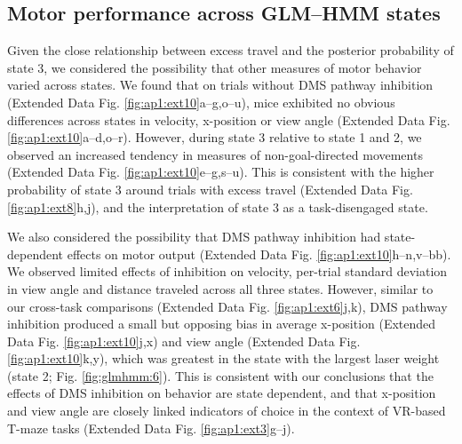\subsection{Motor performance across GLM–HMM states}
\label{sec:glmhmm:2.2.10}

Given the close relationship between excess travel and the posterior probability of state 3, we considered the possibility that other measures of motor behavior varied across states. We found that on trials without DMS pathway inhibition (Extended Data Fig. \ref{fig:ap1:ext10}a–g,o–u), mice exhibited no obvious differences across states in velocity, x-position or view angle (Extended Data Fig. \ref{fig:ap1:ext10}a–d,o–r). However, during state 3 relative to state 1 and 2, we observed an increased tendency in measures of non-goal-directed movements (Extended Data Fig. \ref{fig:ap1:ext10}e–g,s–u). This is consistent with the higher probability of state 3 around trials with excess travel (Extended Data Fig. \ref{fig:ap1:ext8}h,j), and the interpretation of state 3 as a task-disengaged state.

We also considered the possibility that DMS pathway inhibition had state-dependent effects on motor output (Extended Data Fig. \ref{fig:ap1:ext10}h–n,v–bb). We observed limited effects of inhibition on velocity, per-trial standard deviation in view angle and distance traveled across all three states. However, similar to our cross-task comparisons (Extended Data Fig. \ref{fig:ap1:ext6}j,k), DMS pathway inhibition produced a small but opposing bias in average x-position (Extended Data Fig. \ref{fig:ap1:ext10}j,x) and view angle (Extended Data Fig. \ref{fig:ap1:ext10}k,y), which was greatest in the state with the largest laser weight (state 2; Fig. \ref{fig:glmhmm:6}). This is consistent with our conclusions that the effects of DMS inhibition on behavior are state dependent, and that x-position and view angle are closely linked indicators of choice in the context of VR-based T-maze tasks (Extended Data Fig. \ref{fig:ap1:ext3}g–j).